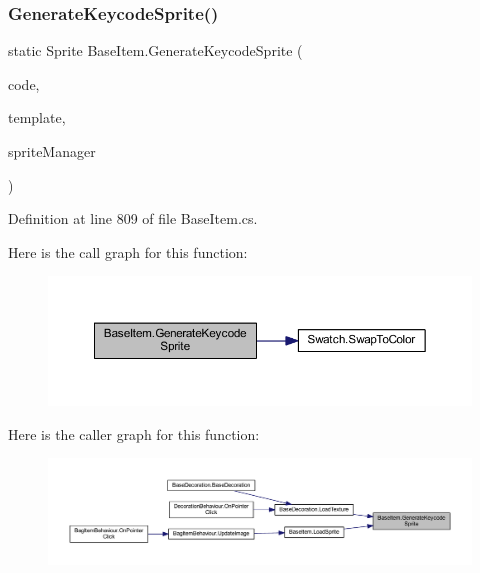 \subsubsection{\texorpdfstring{GenerateKeycodeSprite()}{GenerateKeycodeSprite()}}
{\footnotesize\ttfamily static Sprite Base\+Item.\+Generate\+Keycode\+Sprite (\begin{DoxyParamCaption}\item[{string}]{code,  }\item[{Sprite}]{template,  }\item[{\mbox{\hyperlink{class_sprite_manager}{Sprite\+Manager}}}]{sprite\+Manager }\end{DoxyParamCaption})\hspace{0.3cm}{\ttfamily [static]}}



Definition at line 809 of file Base\+Item.\+cs.

Here is the call graph for this function\+:
\nopagebreak
\begin{figure}[H]
\begin{center}
\leavevmode
\includegraphics[width=350pt]{class_base_item_a0bb5888f3371b291645137272f417b30_cgraph}
\end{center}
\end{figure}
Here is the caller graph for this function\+:
\nopagebreak
\begin{figure}[H]
\begin{center}
\leavevmode
\includegraphics[width=350pt]{class_base_item_a0bb5888f3371b291645137272f417b30_icgraph}
\end{center}
\end{figure}
\mbox{\label{class_base_item_a3888fc05b9a0589c098ed9a8c2f978f2}} 
